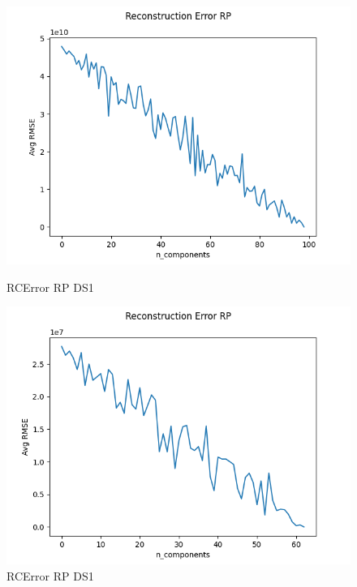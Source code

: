 \begin{figure}
    \begin{minipage}{0.5\textwidth}
        \centering
        \includegraphics[width=.9\linewidth]{rpds1.png}
        \caption{RCError RP DS1}\label{Fig:RP DS1}
    \end{minipage}\hfill
    \begin{minipage}{0.5\textwidth}
        \centering
        \includegraphics[width=.9\linewidth]{rpds2.png}
        \caption{RCError RP DS1}\label{Fig:RP DS2}
    \end{minipage}
\end{figure}


